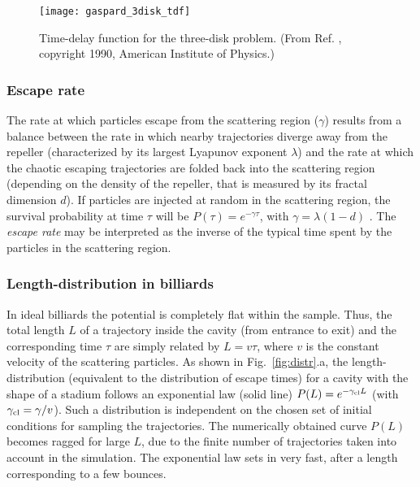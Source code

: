\documentclass[a4paper,10pt]{article}
\newcommand{\gcl}{\gamma_{\rm cl}}
\begin{document}
\begin{figure}
\setlength{\unitlength}{1mm}
\centerline{\texttt{[image: gaspard\_3disk\_tdf]}}
\caption{Time-delay function for the three-disk problem. (From Ref. \protect\cite{Gas89}, copyright 1990, American Institute of Physics.)}
\label{fig:gaspard_3disk_tdf}
\end{figure}

\subsubsection{Escape rate}
\label{subsub:er}

The rate at which particles escape from the scattering region
($\gamma$) results from a balance between the rate in which
nearby trajectories diverge away from the repeller (characterized
by its largest Lyapunov exponent $\lambda$) and the rate at
which the chaotic escaping trajectories are folded back into the
scattering region (depending on the density of the repeller,
that is measured by its fractal dimension $d$). If particles are injected at random in the scattering region, the survival probability at time $\tau$ will be $P(\tau)=e^{-\gamma \tau}$, with $\gamma=\lambda(1-d)$
\cite{Gas89}. The {\em escape rate} may be interpreted
as the inverse of the typical time spent by the particles in
the scattering region.

\subsubsection{Length-distribution in billiards}
\label{subsub:ldib}

In ideal billiards the potential is completely flat within the sample. Thus, the total length $L$ of a trajectory inside the cavity (from entrance to exit) and the corresponding time $\tau$ are simply related by $L =  v \tau$, where $v$ is the constant velocity of the scattering particles. As shown in Fig.~\ref{fig:distr}.a, the length-distribution (equivalent to the distribution of escape times) for a cavity with the shape of a stadium follows an exponential law (solid line) $P(L)=e^{-\gcl L}$ (with $\gcl=\gamma/v$). Such a distribution is independent on the chosen set of initial conditions for sampling the trajectories. The numerically obtained curve $P(L)$ becomes ragged for large $L$, due to the finite number of trajectories taken into account in the simulation. The exponential law sets in very fast, after a length corresponding to a few bounces. 
\end{document}
